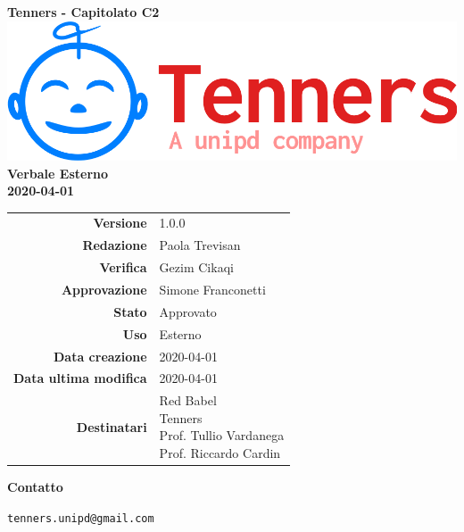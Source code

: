 \begin{titlepage}
	\begin{center}
		\large \textbf{Tenners - Capitolato C2}
		\vfill
		\includegraphics[scale = 0.3]{./res/img/logo.png}\\
		\vfill
		\Huge \textbf{Verbale Esterno} \\
		\textbf {2020-04-01}

        \vfill
        \large

        \begin{tabular}{r|l}
        	\textbf{Versione} & 1.0.0 \\
        	\textbf{Redazione} & Paola Trevisan \\
        	\textbf{Verifica} &  Gezim Cikaqi \\
        	\textbf{Approvazione} & Simone Franconetti \\
        	\textbf{Stato} & Approvato \\
        	\textbf{Uso} &  Esterno\\
        	\textbf{Data creazione} &  2020-04-01\\
        	\textbf{Data ultima modifica} & 2020-04-01 \\
        	\textbf{Destinatari} & \parbox[t]{5cm}{Red Babel\\Tenners \\ Prof. Tullio Vardanega\\ Prof. Riccardo Cardin}
        \end{tabular}
    	\vfill
    	\normalsize
    	\vfill
    	\textbf{Contatto}

    	\texttt{tenners.unipd@gmail.com}

	\end{center}
\end{titlepage}
